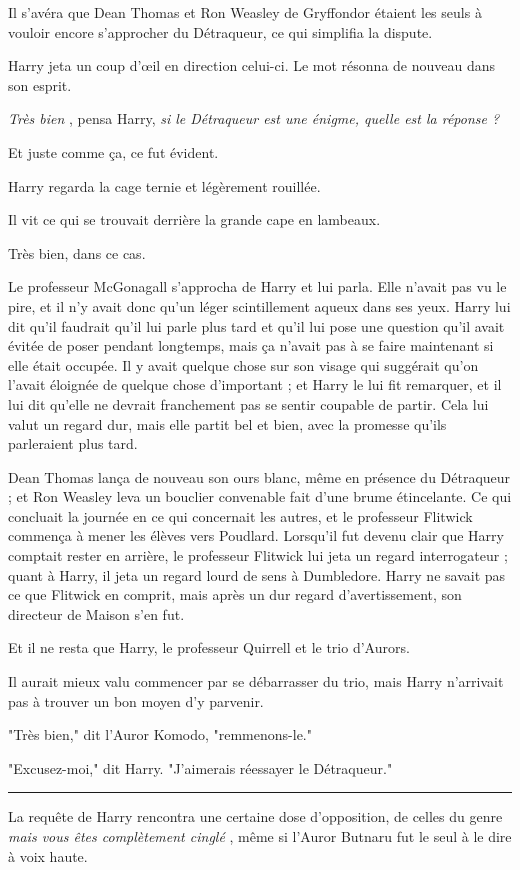 Il s'avéra que Dean Thomas et Ron Weasley de Gryffondor étaient les seuls à vouloir encore s'approcher du Détraqueur, ce qui simplifia la dispute.

Harry jeta un coup d'œil en direction celui-ci. Le mot résonna de nouveau dans son esprit.

\emph{Très bien} , pensa Harry, \emph{si le Détraqueur est une énigme, quelle est la réponse ?} 

Et juste comme ça, ce fut évident.

Harry regarda la cage ternie et légèrement rouillée.

Il vit ce qui se trouvait derrière la grande cape en lambeaux.

Très bien, dans ce cas.

Le professeur McGonagall s'approcha de Harry et lui parla. Elle n'avait pas vu le pire, et il n'y avait donc qu'un léger scintillement aqueux dans ses yeux. Harry lui dit qu'il faudrait qu'il lui parle plus tard et qu'il lui pose une question qu'il avait évitée de poser pendant longtemps, mais ça n'avait pas à se faire maintenant si elle était occupée. Il y avait quelque chose sur son visage qui suggérait qu'on l'avait éloignée de quelque chose d'important ; et Harry le lui fit remarquer, et il lui dit qu'elle ne devrait franchement pas se sentir coupable de partir. Cela lui valut un regard dur, mais elle partit bel et bien, avec la promesse qu'ils parleraient plus tard.

Dean Thomas lança de nouveau son ours blanc, même en présence du Détraqueur ; et Ron Weasley leva un bouclier convenable fait d'une brume étincelante. Ce qui concluait la journée en ce qui concernait les autres, et le professeur Flitwick commença à mener les élèves vers Poudlard. Lorsqu'il fut devenu clair que Harry comptait rester en arrière, le professeur Flitwick lui jeta un regard interrogateur ; quant à Harry, il jeta un regard lourd de sens à Dumbledore. Harry ne savait pas ce que Flitwick en comprit, mais après un dur regard d'avertissement, son directeur de Maison s'en fut.

Et il ne resta que Harry, le professeur Quirrell et le trio d'Aurors.

Il aurait mieux valu commencer par se débarrasser du trio, mais Harry n'arrivait pas à trouver un bon moyen d'y parvenir.

"Très bien," dit l'Auror Komodo, "remmenons-le."

"Excusez-moi," dit Harry. "J'aimerais réessayer le Détraqueur."
\par\noindent\rule{\textwidth}{0.4pt}
La requête de Harry rencontra une certaine dose d'opposition, de celles du genre \emph{mais vous êtes complètement cinglé} , même si l'Auror Butnaru fut le seul à le dire à voix haute.


